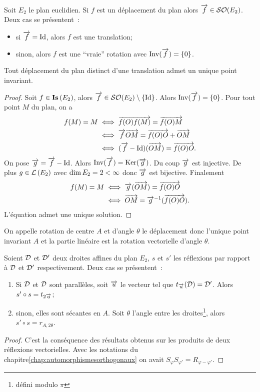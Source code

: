 Soit \(E_2\) le plan euclidien. Si \(f\) est un déplacement du plan alors
\(\overrightarrow{f} \in \mathcal{SO}\!\left(E_2\right)\). Deux cas se présentent~:
\begin{itemize}
  \item si \(\overrightarrow{f} = \operatorname{Id}\), alors \(f\) est une translation;
  \item sinon, alors \(f\) est une ``vraie'' rotation avec
    \(\operatorname{Inv}(\overrightarrow{f})=\{0\}\).
\end{itemize}
%
\begin{theo}
Tout déplacement du plan distinct d'une translation admet un unique point
invariant. \end{theo}
\begin{proof}
  Soit \(f \in \mathbf{Is}\left(E_2\right)\), alors \(\overrightarrow{f}\in \mathcal{SO}\!\left(E_2\right)\setminus\{\operatorname{Id}\}\).
  Alors \(\operatorname{Inv}(\overrightarrow{f})=\{0\}\). Pour tout point \(M\) du plan, on a
  \begin{align*}
    f(M)=M &\iff \overrightarrow{f(O)f(M)} = \overrightarrow{f(O)M} \\
    &\iff \overrightarrow{f}{\overrightarrow{OM}} = \overrightarrow{f(O)O} + \overrightarrow{OM} \\
    &\iff (\overrightarrow{f}-\operatorname{Id})(\overrightarrow{OM}) = \overrightarrow{f(O)O}.
  \end{align*}
  On pose \(\overrightarrow{g}=\overrightarrow{f}-\operatorname{Id}\). Alors \(\operatorname{Inv}(\overrightarrow{f})=\operatorname{Ker}(\overrightarrow{g})\). Du
  coup \(\overrightarrow{g}\) est injective. De plus \(g \in \mathcal{L}\left(E_2\right)\) avec \(\operatorname{dim}
  E_2=2 <\infty\) donc \(\overrightarrow{g}\) est bijective. Finalement
  \begin{align*}
    f(M)=M &\iff \overrightarrow{g}(\overrightarrow{OM}) = \overrightarrow{f(O)O} \\
    &\iff \overrightarrow{OM} = \overrightarrow{g}^{-1}(\overrightarrow{f(O)O}).
  \end{align*}
  L'équation admet une unique solution.
\end{proof}
\begin{defdef}
  On appelle rotation de centre \(A\) et d'angle \(\theta\) le déplacement donc
  l'unique point invariant \(A\) et la partie linéaire est la rotation
  vectorielle d'angle \(\theta\).
\end{defdef}
%
\begin{prop}
  Soient \(\mathcal{D}\) et \(\mathcal{D}'\) deux droites affines du plan \(E_2\), \(s\) et
  \(s'\) les réflexions par rapport à \(\mathcal{D}\) et \(\mathcal{D}'\) respectivement. Deux
  cas se présentent~:
  \begin{enumerate}
    \item Si \(\mathcal{D}\) et \(\mathcal{D}\) sont parallèles, soit \(\overrightarrow{u}\) le vecteur tel que
      \(t_{\overrightarrow{u}}(\mathcal{D})=\mathcal{D}'\). Alors \(s'\circ s=t_{2\overrightarrow{u}}\);
    \item sinon, elles sont sécantes en \(A\). Soit \(\theta\) l'angle entre les
      droites\footnote{défini modulo \(\pi\)}, alors \(s'\circ s=r_{A,
      2\theta}\).
  \end{enumerate}
\end{prop}
\begin{proof}
  C'est la conséquence des résultats obtenus sur les produits de deux réflexions
  vectorielles. Avec les notations du chapitre\ref{chap:automorphismesorthogonaux} on avait \(S_\varphi
  S_{\varphi'}=R_{\varphi-\varphi'}\).
\end{proof}

